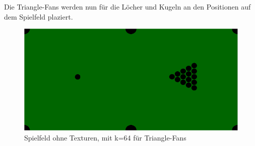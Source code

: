 	Die Triangle-Fans werden nun für die Löcher und Kugeln an den Positionen auf dem Spielfeld plaziert.
	\begin{figure}[h]
		\caption{Spielfeld ohne Texturen, mit k=64 für Triangle-Fans}
			\includegraphics[width=\textwidth]{bilder/untextured_pool_low.png} 
	\end{figure}

